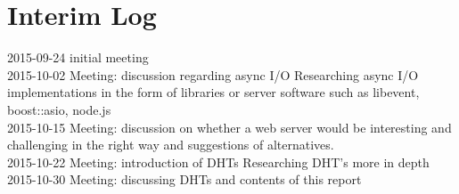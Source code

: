 \documentclass{article}
\begin{document}
\hspace*{-3cm}
\begin{ganttchart}{1}{22}
 \\
 \\

\\
 \\
 \\
 \\
 \\
 \\
 \\
 \\
 \\
 \\

\end{ganttchart}
\hspace*{-3cm}

\section{Interim Log}
2015-09-24 initial meeting\\
2015-10-02 Meeting: discussion regarding async I/O
	Researching async I/O implementations in the form of libraries or server software such as libevent, boost::asio, node.js\\
2015-10-15 Meeting: discussion on whether a web server would be interesting and challenging in the right way and suggestions of alternatives.\\
2015-10-22 Meeting: introduction of DHTs
	Researching DHT’s more in depth \\
2015-10-30 Meeting: discussing DHTs and contents of this report
\end{document}
